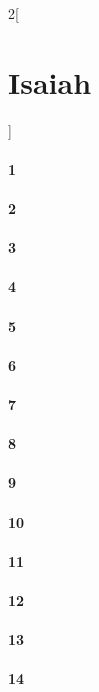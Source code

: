 \documentclass{book}
\begin{document}
\begin{multicols}{2}[\part{Isaiah}]
\subsection*{1}
\subsection*{2}
\subsection*{3}
\subsection*{4}
\subsection*{5}
\subsection*{6}
\subsection*{7}
\subsection*{8}
\subsection*{9}
\subsection*{10}
\subsection*{11}
\subsection*{12}
\subsection*{13}
\subsection*{14}

\end{multicols}
\end{document}
